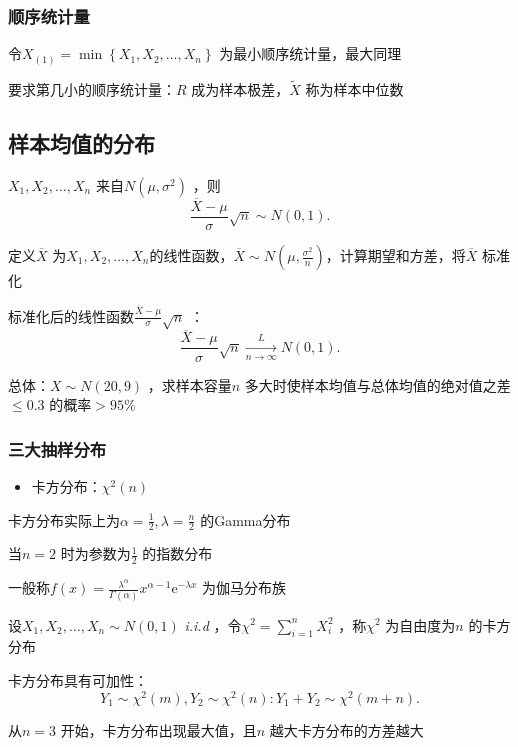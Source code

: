 \subsubsection*{顺序统计量}%
\label{subsub:顺序统计量}
令$X_{\left( 1 \right) }=\min\left\{ X_1,X_2,\ldots ,X_{n} \right\} $ 为最小顺序统计量，最大同理

要求第几小的顺序统计量：$R$ 成为样本极差，$\widetilde{X}$ 称为样本中位数
\subsection{样本均值的分布}%
\label{sub:样本均值的分布}
\begin{thm}
    $X_1,X_2,\ldots ,X_{n}$ 来自$N\left( \mu,\sigma^2 \right) $ ，则\[
        \frac{\overline{X}-\mu}{\sigma} \sqrt{n} \sim N\left( 0,1 \right) 
    .\] 
\end{thm}
定义$\overline{X}$ 为$X_1,X_2,\ldots ,X_{n}$的线性函数，$\overline{X}\sim N\left( \mu,\frac{\sigma^2}{n}  \right) $，计算期望和方差，将$\overline{X}$ 标准化
\begin{thm}
    标准化后的线性函数$\frac{\overline{X}-\mu}{\sigma} \sqrt{n} $ ：
    \[
        \frac{\overline{X}-\mu}{\sigma} \sqrt{n} \xrightarrow[n\to \infty]{L} N\left( 0,1 \right) 
    .\] 
\end{thm}
\begin{eg}
    总体：$X\sim N\left( 20,9 \right) $ ，求样本容量$n$ 多大时使样本均值与总体均值的绝对值之差$\le 0.3$ 的概率$> 95\%$
\end{eg}
\subsubsection{三大抽样分布}%
\label{subsub:三大抽样分布}
\begin{itemize}
    \item 卡方分布：$\chi^2\left( n \right) $
    
\end{itemize}
\begin{notation}
    卡方分布实际上为$\alpha=\frac{1}{2} ,\lambda=\frac{n}{2} $ 的Gamma分布
    
    当$n=2$ 时为参数为$\frac{1}{2} $ 的指数分布
    
    一般称$f\left( x \right) =\frac{\lambda^{\alpha}}{\Gamma\left( \alpha \right) } x^{\alpha-1}\mathrm{e}^{-\lambda x} $ 为伽马分布族
\end{notation}
\begin{defi}
    设$X_1,X_2,\ldots ,X_{n}\sim N\left( 0,1 \right) $ \textit{i.i.d} ，令$\chi^2=\sum_{i=1}^{n} X_{i}^2$ ，称$\chi^2$ 为自由度为$n$ 的卡方分布
\end{defi}
\begin{notation}
    卡方分布具有可加性：\[
        Y_1\sim \chi^2\left( m \right) ,Y_2\sim \chi^2\left( n \right) : Y_1+Y_2\sim \chi^2\left( m+n \right) 
    .\] 
\end{notation}
从$n=3$ 开始，卡方分布出现最大值，且$n$ 越大卡方分布的方差越大

